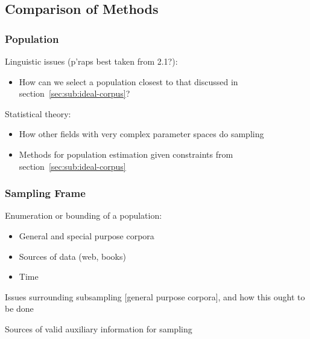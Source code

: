 \subsection{Comparison of Methods}
\subsubsection{Population}
Linguistic issues (p'raps best taken from 2.1?):
\begin{itemize}
    \item How can we select a population closest to that discussed in section~\ref{sec:sub:ideal-corpus}?
\end{itemize}
Statistical theory:
\begin{itemize}
    \item How other fields with very complex parameter spaces do sampling
    \item Methods for population estimation given constraints from section~\ref{sec:sub:ideal-corpus}
\end{itemize}
\subsubsection{Sampling Frame}
Enumeration or bounding of a population:
\begin{itemize}
    \item General and special purpose corpora
    \item Sources of data (web, books)
    \item Time
\end{itemize}
Issues surrounding subsampling [general purpose corpora], and how this ought to be done

Sources of valid auxiliary information for sampling
